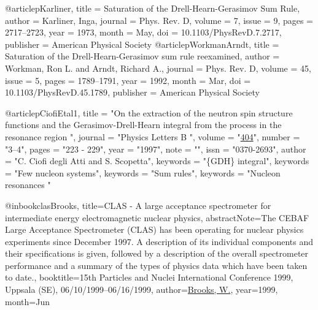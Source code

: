 @article{pKarliner,
  title = {Saturation of the Drell-Hearn-Gerasimov Sum Rule},
  author = {Karliner, Inga},
  journal = {Phys. Rev. D},
  volume = {7},
  issue = {9},
  pages = {2717--2723},
  year = {1973},
  month = {May},
  doi = {10.1103/PhysRevD.7.2717},
  publisher = {American Physical Society}
}
@article{pWorkmanArndt,
  title = {Saturation of the Drell-Hearn-Gerasimov sum rule reexamined},
  author = {Workman, Ron L. and Arndt, Richard A.},
  journal = {Phys. Rev. D},
  volume = {45},
  issue = {5},
  pages = {1789--1791},
  year = {1992},
  month = {Mar},
  doi = {10.1103/PhysRevD.45.1789},
  publisher = {American Physical Society}
}

@article{pCiofiEtal1,
title = "On the extraction of the neutron spin structure functions and the Gerasimov-Drell-Hearn integral from the process in the resonance region ",
journal = "Physics Letters B ",
volume = "\href{http://www.sciencedirect.com/science/article/pii/S0370269397005765}{404}",
number = "3–4",
pages = "223 - 229",
year = "1997",
note = "",
issn = "0370-2693",
author = "C. Ciofi degli Atti and S. Scopetta",
keywords = "\{GDH\} integral",
keywords = "Few nucleon systems",
keywords = "Sum rules",
keywords = "Nucleon resonances "
}

@inbook{clasBrooks, 
 title={{CLAS} - A large acceptance spectrometer for intermediate energy electromagnetic nuclear physics},
 abstractNote={The CEBAF Large Acceptance Spectrometer (CLAS) has been operating for nuclear physics experiments since December 1997. A description of its individual components and their specifications is given, followed by a description of the overall spectrometer performance and a summary of the types of physics data which have been taken to date.}, 
 booktitle={15th Particles and Nuclei International Conference 1999, Uppsala (SE), 06/10/1999--06/16/1999}, 
 author={\href{http://www.osti.gov/scitech/servlets/purl/754039}{Brooks, W.}}, 
 year={1999}, 
 month={Jun}
 }

